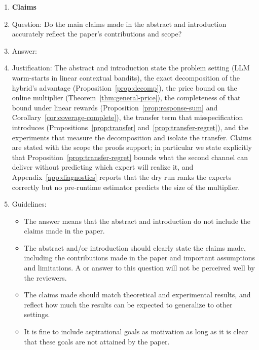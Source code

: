\documentclass{article}
\theoremstyle{definition}
\theoremstyle{remark}
\theoremstyle{remark}
\begin{document}
\begin{enumerate}

\item {\bf Claims}
    \item[] Question: Do the main claims made in the abstract and introduction accurately reflect the paper's contributions and scope?
    \item[] Answer: \answerYes{} %
    \item[] Justification: The abstract and introduction state the problem setting (LLM warm-starts in linear contextual bandits), the exact decomposition of the hybrid's advantage (Proposition~\ref{prop:decomp}), the price bound on the online multiplier (Theorem~\ref{thm:general-price}), the completeness of that bound under linear rewards (Proposition~\ref{prop:response-sum} and Corollary~\ref{cor:coverage-complete}), the transfer term that misspecification introduces (Propositions~\ref{prop:transfer} and~\ref{prop:transfer-regret}), and the experiments that measure the decomposition and isolate the transfer. Claims are stated with the scope the proofs support; in particular we state explicitly that Proposition~\ref{prop:transfer-regret} bounds what the second channel can deliver without predicting which expert will realize it, and Appendix~\ref{app:diagnostics} reports that the dry run ranks the experts correctly but no pre-runtime estimator predicts the size of the multiplier.
    \item[] Guidelines:
    \begin{itemize}
        \item The answer \answerNA{} means that the abstract and introduction do not include the claims made in the paper.
        \item The abstract and/or introduction should clearly state the claims made, including the contributions made in the paper and important assumptions and limitations. A \answerNo{} or \answerNA{} answer to this question will not be perceived well by the reviewers. 
        \item The claims made should match theoretical and experimental results, and reflect how much the results can be expected to generalize to other settings. 
        \item It is fine to include aspirational goals as motivation as long as it is clear that these goals are not attained by the paper. 
    \end{itemize}


\end{enumerate}
\end{document}
